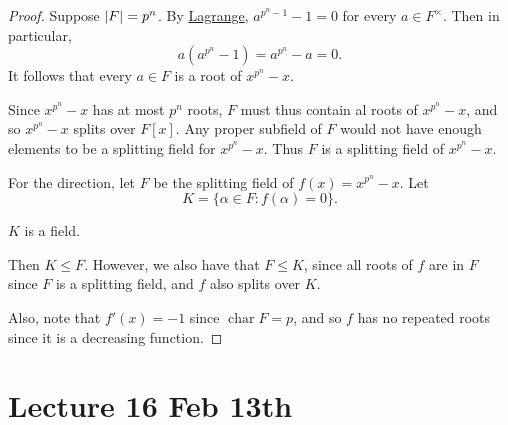 \documentclass[notoc,notitlepage,nobib]{tufte-book}
\DeclareMathOperator{\Char}{char}
\begin{document}
\begin{proof}
  Suppose $\left|F\right| = p^n$. By \hyperref[thm:lagrange_s_theorem]{Lagrange}, $a^{p^n - 1} - 1 = 0$ for every $a \in F^\times$. Then in particular,
  \begin{equation*}
    a(a^{p^n} - 1) = a^{p^n} - a = 0.
  \end{equation*}
  It follows that every $a \in F$ is a root of $x^{p^n} - x$.

  Since $x^{p^n} - x$ has at most $p^n$ roots, $F$ must thus contain al roots of $x^{p^n}
  - x$, and so $x^{p^n} - x$ splits over $F[x]$. Any proper subfield of $F$ would not have
  enough elements to be a splitting field for $x^{p^n} - x$. Thus $F$ is a splitting field
  of $x^{p^n} - x$.

  For the \hlbnoted{$\impliedby$} direction, let $F$ be the splitting field of $f(x) =
  x^{p^n} - x$. Let
  \begin{equation*}
    K = \{ \alpha \in F : f(\alpha) = 0 \}.
  \end{equation*}
  \begin{ex}
    $K$ is a field.
  \end{ex}

  Then $K \leq F$. However, we also have that $F \leq K$, since all roots of $f$ are in
  $F$ since $F$ is a splitting field, and $f$ also splits over $K$.

  Also, note that $f'(x) = -1$ since $\Char F = p$, and so $f$ has no repeated roots since
  it is a decreasing function.
\end{proof}



\chapter{Lecture 16 Feb 13th}%
\label{chp:lecture_16_feb_13th}
\end{document}
